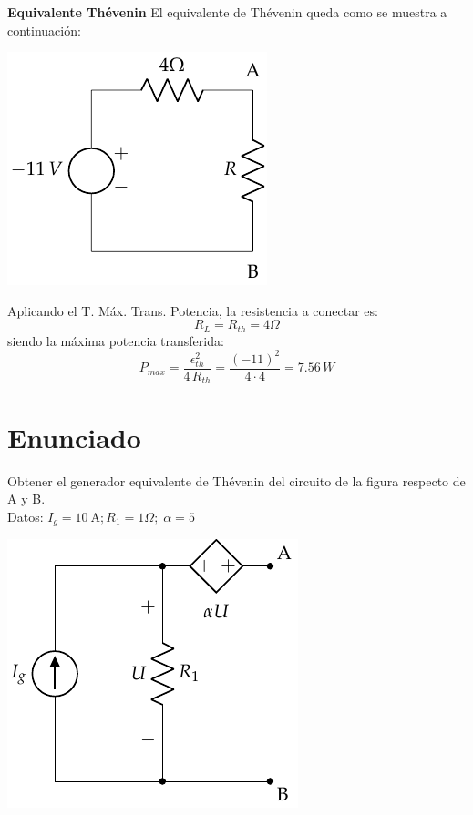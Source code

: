 \textbf{Equivalente Thévenin} El equivalente de Thévenin queda como se
muestra a continuación:

\begin{center}
  \includegraphics{figuras/BT1_17_th.pdf}
\end{center}

Aplicando el T. Máx. Trans. Potencia, la resistencia a conectar es:
\begin{equation*}
  R_L=R_{th}=4\Omega
\end{equation*}
siendo la máxima potencia transferida:
\begin{equation*}
  P_{max}=\dfrac{\epsilon_{th}^2}{4\,R_{th}}=\dfrac{(-11)^2}{4\cdot 4}=7.56\,W
\end{equation*}


\section{Enunciado}
Obtener el generador equivalente de Thévenin del circuito de la figura respecto de A y B.\\
Datos: $I_g=\qty{10}{\ampere}; R_1=1\Omega;\; \alpha=5$
\begin{center}
  \includegraphics{figuras/Thevenin1.pdf}
\end{center}

